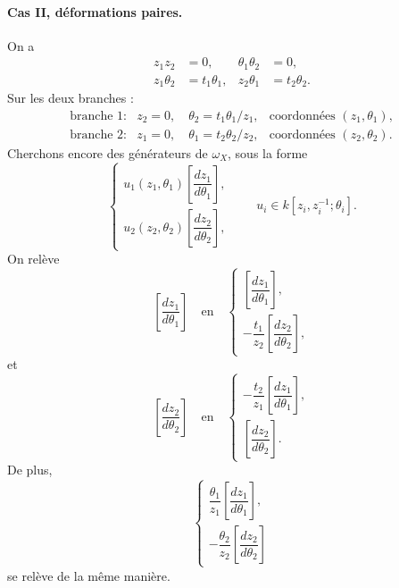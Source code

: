 \documentclass[11pt]{article}
\begin{document}
\paragraph{Cas II, déformations paires.}
On a
\[
\begin{array}{rlrl}
z_1z_2&=0, & \theta_1\theta_2&=0,\\
z_1\theta_2&=t_1\theta_1, & z_2\theta_1&=t_2\theta_2 .
\end{array}
\]
Sur les deux branches :
\[
\begin{array}{lll}
\text{branche 1:}& z_2=0,\quad \theta_2=t_1\theta_1/z_1,
& \text{coordonnées }(z_1,\theta_1),\\[1mm]
\text{branche 2:}& z_1=0,\quad \theta_1=t_2\theta_2/z_2,
& \text{coordonnées }(z_2,\theta_2).
\end{array}
\]
Cherchons encore des générateurs de $\omega_X$, sous la forme
\[
\begin{cases}
u_1(z_1,\theta_1)\left[\dfrac{dz_1}{d\theta_1}\right],\\[2mm]
u_2(z_2,\theta_2)\left[\dfrac{dz_2}{d\theta_2}\right],
\end{cases}
\qquad
u_i\in k[z_i,z_i^{-1};\theta_i].
\]
On relève
\[
\left[\frac{dz_1}{d\theta_1}\right]
\quad\text{en}\quad
\begin{cases}
\left[\dfrac{dz_1}{d\theta_1}\right],\\[2mm]
-\dfrac{t_1}{z_2}\left[\dfrac{dz_2}{d\theta_2}\right],
\end{cases}
\]
et
\[
\left[\frac{dz_2}{d\theta_2}\right]
\quad\text{en}\quad
\begin{cases}
-\dfrac{t_2}{z_1}\left[\dfrac{dz_1}{d\theta_1}\right],\\[2mm]
\left[\dfrac{dz_2}{d\theta_2}\right].
\end{cases}
\]
De plus,
\[
\begin{cases}
\dfrac{\theta_1}{z_1}\left[\dfrac{dz_1}{d\theta_1}\right],\\[2mm]
-\dfrac{\theta_2}{z_2}\left[\dfrac{dz_2}{d\theta_2}\right]
\end{cases}
\]
se relève de la même manière.
\end{document}
